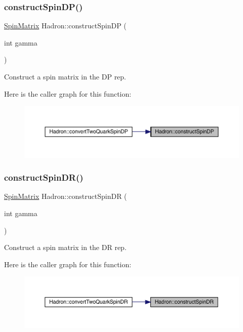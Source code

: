 \subsubsection{\texorpdfstring{constructSpinDP()}{constructSpinDP()}}
{\footnotesize\ttfamily \mbox{\hyperlink{group__defs_gad066768e154e358a7f3c0708c774be29}{Spin\+Matrix}} Hadron\+::construct\+Spin\+DP (\begin{DoxyParamCaption}\item[{int}]{gamma }\end{DoxyParamCaption})}



Construct a spin matrix in the DP rep. 

Here is the caller graph for this function\+:\nopagebreak
\begin{figure}[H]
\begin{center}
\leavevmode
\includegraphics[width=350pt]{d1/daf/namespaceHadron_af2328410f9a0a7191a4d319284425fed_icgraph}
\end{center}
\end{figure}
\mbox{\label{namespaceHadron_add425eaa856f87203aaf3bd1e3eb086d}} 
\subsubsection{\texorpdfstring{constructSpinDR()}{constructSpinDR()}}
{\footnotesize\ttfamily \mbox{\hyperlink{group__defs_gad066768e154e358a7f3c0708c774be29}{Spin\+Matrix}} Hadron\+::construct\+Spin\+DR (\begin{DoxyParamCaption}\item[{int}]{gamma }\end{DoxyParamCaption})}



Construct a spin matrix in the DR rep. 

Here is the caller graph for this function\+:\nopagebreak
\begin{figure}[H]
\begin{center}
\leavevmode
\includegraphics[width=350pt]{d1/daf/namespaceHadron_add425eaa856f87203aaf3bd1e3eb086d_icgraph}
\end{center}
\end{figure}
\mbox{\label{namespaceHadron_ac6bc3e869d76d287be23c6d20cb9c104}} 
